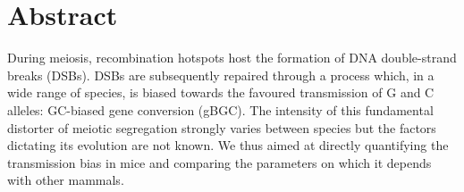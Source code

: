 

\section*{Abstract}

During meiosis, recombination hotspots host the formation of DNA double-strand breaks (DSBs). DSBs are subsequently repaired through a process which, in a wide range of species, is biased towards the favoured transmission of G and C alleles: GC-biased gene conversion (gBGC).
The intensity of this fundamental distorter of meiotic segregation strongly varies between species but the factors dictating its evolution are not known.
We thus aimed at directly quantifying the transmission bias in mice and comparing the parameters on which it depends with other mammals.

